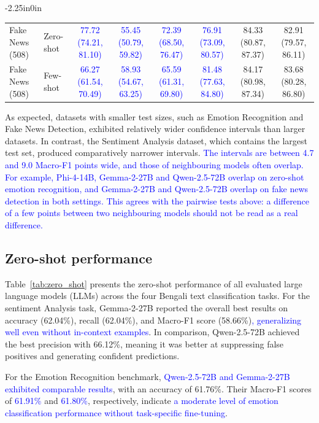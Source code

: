 \documentclass[10pt,letterpaper]{article}
\newcommand{\rev}[1]{\textcolor{blue}{#1}}
\begin{document}
\begin{table}[!t]
\begin{adjustwidth}{-2.25in}{0in}
{\begin{tabular}{|l|l|c|c|c|c|c|c|}
\hline
Fake News (508) & Zero-shot & \rev{77.72 (74.21, 81.10)} & \rev{55.45 (50.79, 59.82)} & \rev{72.39 (68.50, 76.47)} & \rev{76.91 (73.09, 80.57)} & 84.33 (80.87, 87.37) & 82.91 (79.57, 86.11) \\
Fake News (508) & Few-shot & \rev{66.27 (61.54, 70.49)} & \rev{58.93 (54.67, 63.25)} & \rev{65.59 (61.31, 69.80)} & \rev{81.48 (77.63, 84.80)} & 84.17 (80.98, 87.34) & 83.68 (80.28, 86.80) \\
\hline
\end{tabular}%
}
\end{adjustwidth}
\end{table}

As expected, datasets with smaller test sizes, such as Emotion Recognition and Fake News Detection, exhibited relatively wider confidence intervals than larger datasets. In contrast, the Sentiment Analysis dataset, which contains the largest test set, produced comparatively narrower intervals. \rev{The intervals are between 4.7 and 9.0 Macro-F1 points wide, and those of neighbouring models often overlap. For example, Phi-4-14B, Gemma-2-27B and Qwen-2.5-72B overlap on zero-shot emotion recognition, and Gemma-2-27B and Qwen-2.5-72B overlap on fake news detection in both settings. This agrees with the pairwise tests above: a difference of a few points between two neighbouring models should not be read as a real difference.}



\subsection*{Zero-shot performance}
\label{sec:zero_shot}

Table~\ref{tab:zero_shot} presents the zero-shot performance of all evaluated large language models (LLMs) across the four Bengali text classification tasks. For the sentiment Analysis task, Gemma-2-27B reported the overall best results on accuracy (62.04\%), recall (62.04\%), and Macro-F1 score (58.66\%)\rev{, generalizing well even without in-context examples}. In comparison, Qwen-2.5-72B achieved the best precision with 66.12\%, meaning it was better at suppressing false positives and generating confident predictions.

For the Emotion Recognition benchmark, \rev{Qwen-2.5-72B and Gemma-2-27B exhibited comparable results}, with an accuracy of 61.76\%. Their Macro-F1 scores of \rev{61.91\%} and \rev{61.80\%}, respectively, indicate \rev{a moderate level of emotion classification performance without task-specific fine-tuning}.
\end{document}
